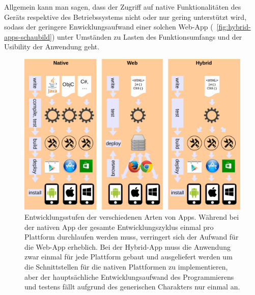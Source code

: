 Allgemein kann man sagen, dass der Zugriff auf native Funktionalitäten des Geräts respektive des Betriebssystems nicht oder nur gering unterstützt wird, sodass der geringere Enwicklungsaufwand einer solchen Web-App (\seename\  \autoref{fig:hybrid-apps-schaubild}) unter Umständen zu Lasten des Funktionsumfangs und der Usibility der Anwendung geht.




\begin{figure}
\centering
\includegraphics[width=1\linewidth]{./images/hybrid-apps-schaubild}
\caption[Schaubild Hybrid Apps]{Entwicklungsstufen der verschiedenen Arten von Apps. Während bei der nativen App der gesamte Entwicklungszyklus einmal pro Plattform durchlaufen werden muss, verringert sich der Aufwand für die Web-App erheblich. Bei der Hybrid-App muss die Anwendung zwar einmal für jede Plattform gebaut und ausgeliefert werden um die Schnittstellen für die nativen Plattformen zu implementieren, aber der hauptsächliche Entwicklungsaufwand des Programmierens und testens fällt aufgrund des generischen Charakters nur einmal an.}
\label{fig:hybrid-apps-schaubild}
\end{figure}

